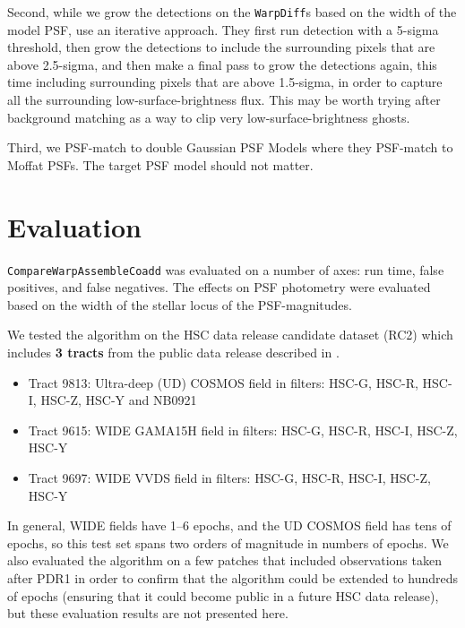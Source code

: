 \documentclass[DM,authoryear,toc]{lsstdoc}
\begin{document}
Second, while we grow the detections on the \texttt{WarpDiff}s  based on  the width of the model PSF, \citet{Desai2016} use an iterative approach.
They first run detection with a  5-sigma threshold,  then grow the detections to include the surrounding pixels that are above 2.5-sigma, and then make a final pass to grow the detections again, this time including surrounding pixels that are above 1.5-sigma,
in order to capture all the surrounding low-surface-brightness flux.
This may be worth trying  after background matching as a way to clip very low-surface-brightness ghosts.

Third, we PSF-match to double Gaussian PSF Models where they PSF-match to Moffat PSFs.
The target PSF model should not matter.


\section{Evaluation}
\label{sec:evaluation}

\texttt{CompareWarpAssembleCoadd} was evaluated on a number of axes: run time, false positives, and false negatives.
The effects on PSF photometry were evaluated based on the width of the stellar locus of the PSF-magnitudes.

We tested the algorithm on the HSC data release candidate dataset (RC2) which includes \textbf{3 tracts} from the public data release  described in \citet{Bosch2018}.

\begin{itemize}
\item Tract 9813: Ultra-deep (UD) COSMOS field  in filters: HSC-G, HSC-R, HSC-I, HSC-Z, HSC-Y and NB0921
\item Tract 9615: WIDE GAMA15H field  in filters: HSC-G, HSC-R, HSC-I, HSC-Z, HSC-Y
\item Tract 9697: WIDE VVDS field  in filters: HSC-G, HSC-R, HSC-I, HSC-Z, HSC-Y
\end{itemize}

In general, WIDE fields have 1--6 epochs, and the UD COSMOS field has tens of epochs, so this test set spans two orders of magnitude in numbers of epochs.
We also evaluated the algorithm on a few patches that included observations taken after PDR1 in order to confirm that the algorithm could be extended to hundreds of epochs (ensuring that it could become public in a future HSC data release), but these evaluation results are not presented here.
\end{document}
